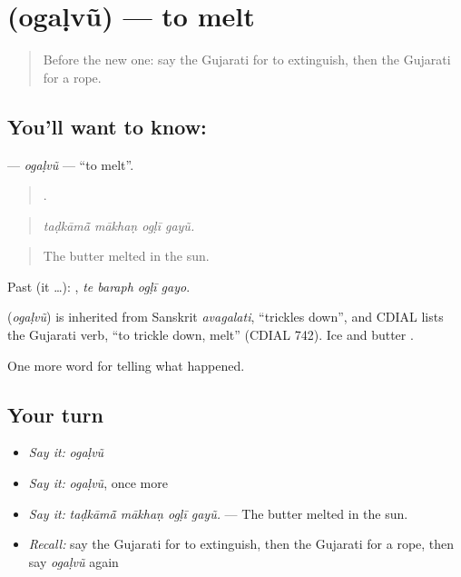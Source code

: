 \section[\texorpdfstring{\gu{ઓગળવું} (ogaḷvũ)}{ઓગળવું (ogaḷvũ)}]{ (ogaḷvũ) — to melt}

\label{lesson:GU-C302-ogalvu}



\begin{quote}
Before the new one: say the Gujarati for to extinguish, then the Gujarati for a rope.
\end{quote}

\subsection*{You'll want to know: }
\textbf{} — \emph{ogaḷvũ} — \textquotedblleft{}to melt\textquotedblright{}.

\begin{quote}
   .
\end{quote}

\begin{quote}
\emph{taḍkāmā̃ mākhaṇ ogḷī gayũ.}
\end{quote}

\begin{quote}
The butter melted in the sun.
\end{quote}

Past (it …):    , \emph{te baraph ogḷī gayo}.

\begin{cousinweb}
\textbf{} (\emph{ogaḷvũ}) is inherited from Sanskrit \emph{avagalati}, \textquotedblleft{}trickles down\textquotedblright{}, and CDIAL lists the Gujarati verb, \textquotedblleft{}to trickle down, melt\textquotedblright{} (CDIAL 742). Ice and butter \textbf{ }.
\end{cousinweb}

\begin{grammarlens}[title={What you've built}]
One more word for telling what happened.
\end{grammarlens}

\subsection*{Your turn}
\begin{itemize}
\raggedright
  \item \emph{Say it:} \emph{ogaḷvũ}
  \item \emph{Say it:} \emph{ogaḷvũ}, once more
  \item \emph{Say it:} \emph{taḍkāmā̃ mākhaṇ ogḷī gayũ.} — The butter melted in the sun.
  \item \emph{Recall:} say the Gujarati for to extinguish, then the Gujarati for a rope, then say \emph{ogaḷvũ} again
\end{itemize}

